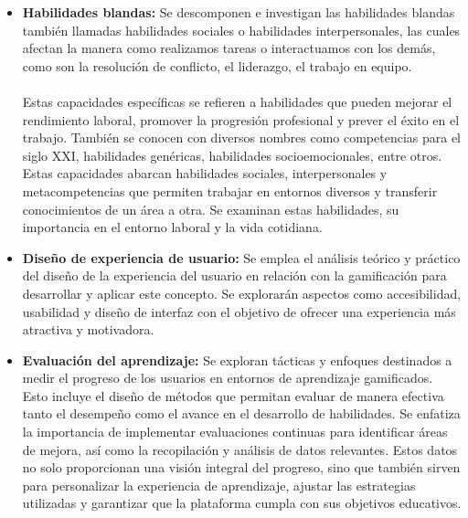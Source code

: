 \begin{itemize}
    \item \textbf{Habilidades blandas:}
 Se descomponen e investigan las habilidades blandas también llamadas habilidades sociales o habilidades interpersonales, las cuales afectan la manera como realizamos tareas o interactuamos con los demás, como son la resolución de conflicto, el liderazgo, el trabajo en equipo. 
 \\ \\
Estas capacidades específicas se refieren a habilidades que pueden mejorar el rendimiento laboral, promover la progresión profesional y prever el éxito en el trabajo. También se conocen con diversos nombres como competencias para el siglo XXI, habilidades genéricas, habilidades socioemocionales, entre otros. Estas capacidades abarcan habilidades sociales, interpersonales y metacompetencias que permiten trabajar en entornos diversos y transferir conocimientos de un área a otra.\cite{h} Se examinan estas habilidades, su importancia en el entorno laboral y la vida cotidiana.

\end{itemize}

\begin{itemize}
    \item \textbf{Diseño de experiencia de usuario:}
Se emplea el análisis teórico y práctico del diseño de la experiencia del usuario en relación con la gamificación para desarrollar y aplicar este concepto. Se explorarán aspectos como accesibilidad, usabilidad y diseño de interfaz con el objetivo de ofrecer una experiencia más atractiva y motivadora. 
\end{itemize}

\begin{itemize}
    \item \textbf{Evaluación del aprendizaje:}  Se exploran tácticas y enfoques destinados a medir el progreso de los usuarios en entornos de aprendizaje gamificados. Esto incluye el diseño de métodos que permitan evaluar de manera efectiva tanto el desempeño como el avance en el desarrollo de habilidades. Se enfatiza la importancia de implementar evaluaciones continuas para identificar áreas de mejora, así como la recopilación y análisis de datos relevantes. Estos datos no solo proporcionan una visión integral del progreso, sino que también sirven para personalizar la experiencia de aprendizaje, ajustar las estrategias utilizadas y garantizar que la plataforma cumpla con sus objetivos educativos.

\end{itemize}

